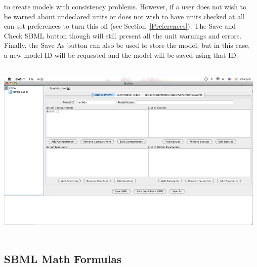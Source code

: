 \documentclass[titlepage,11pt]{article}
\begin{document}
to create models with consistency problems.  However, if a user does
not wish to be warned about undeclared units or does not wish to have
units checked at all can set preferences to turn this off
(see Section~\ref{Preferences}).  The Save and Check SBML button
though will still present all the unit warnings and errors.
Finally, the Save As button can also be used to store the
model, but in this case, a new model ID will be requested and the
model will be saved using that ID. 
\begin{center}
\includegraphics[height=90mm]{screenshots/SBMLedit}
\end{center}

\subsection{\label{SBMLMath}SBML Math Formulas}
\end{document}
